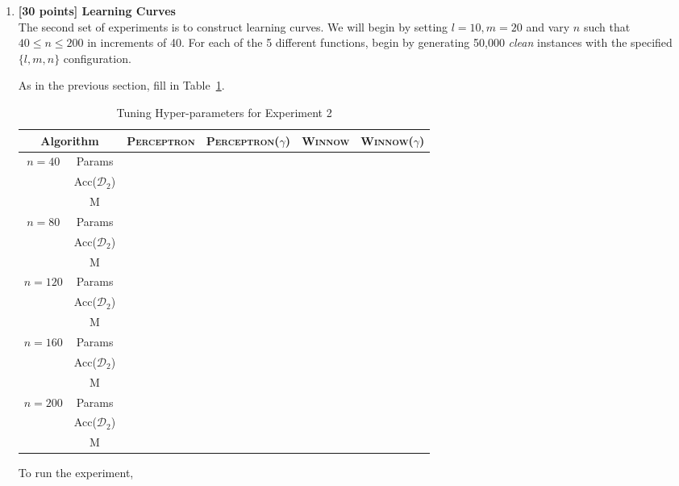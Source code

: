 \documentclass[12pt,letterpaper]{article}
\begin{document}
\begin{enumerate}
\begin{enumerate}
\begin{enumerate}
Plot the cumulative number of mistakes $M$ versus the number of instances $(0 \leq N \leq 50,000)$ observed.  For each configuration, plot all four curves on the same graph such that they can be easily compared.  In each case, the $x$-axis should be the number of instances observed, $N$, and the $y$-axis should be the number of mistakes made $M$. You should have two graphs (one for each dataset) with four curves on each.  Please clearly label your graphs.\footnote{If you are having memory issues, you can consider plotting the cumulative error every 10 or 100 instances.}
\end{enumerate}
%
\item
{\bf [30 points] Learning Curves}\\

The second set of experiments is to construct learning curves.  We will begin by setting $l=10, m=20$ and vary $n$ such that $40 \leq n \leq 200$ in increments of 40.  For each of the 5 different functions, begin by generating 50,000 {\em clean} instances with the specified $\{l,m,n\}$ configuration.  

As in the previous section, fill in Table~\ref{table:exp2}.
%
\begin{table}[htb]
\begin{center}
\begin{tabular}{|c|c|c|c|c|c|}
\hline
\multicolumn{2}{|c|}{Algorithm} & \textsc{Perceptron} & \textsc{Perceptron}($\gamma$) & \textsc{Winnow} & \textsc{Winnow}($\gamma$) \\
\hline
\multirow{3}{*}{$n=40$} & Params & & & & \\
\cline{2-6}
& Acc($\mathcal{D}_2$) & & & & \\
\cline{2-6}
& M & & & & \\
\hline
\multirow{3}{*}{$n=80$} & Params & & & & \\
\cline{2-6}
& Acc($\mathcal{D}_2$) & & & & \\
\cline{2-6}
& M & & & & \\
\hline
\multirow{3}{*}{$n=120$} & Params & & & & \\
\cline{2-6}
& Acc($\mathcal{D}_2$) & & & & \\
\cline{2-6}
& M & & & & \\
\hline
\multirow{3}{*}{$n=160$} & Params & & & & \\
\cline{2-6}
& Acc($\mathcal{D}_2$) & & & & \\
\cline{2-6}
& M & & & & \\
\hline
\multirow{3}{*}{$n=200$} & Params & & & & \\
\cline{2-6}
& Acc($\mathcal{D}_2$) & & & & \\
\cline{2-6}
& M & & & & \\
\hline
\end{tabular}
\end{center}
\caption{Tuning Hyper-parameters for Experiment 2}
\label{table:exp2}
\end{table}
%
To run the experiment,


\end{enumerate}
\end{enumerate}
\end{document}
